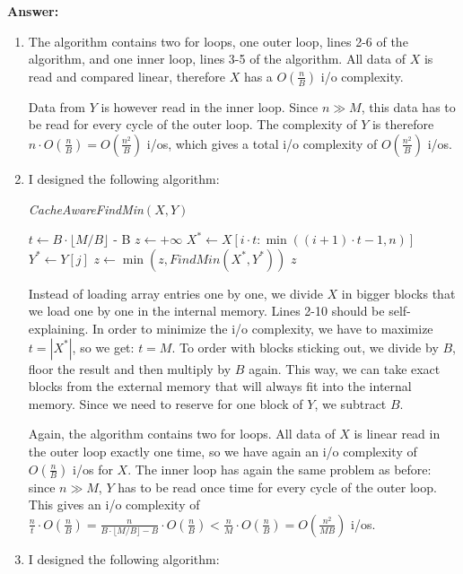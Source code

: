 \documentclass{article}
\newcommand{\io}{{\sc i/o}\xspace}
\newcommand{\ios}{{\io}s\xspace}
\newcounter{rcounter}
\newenvironment{rlist}%
{\begin{list}{\setnr-\arabic{rcounter}}{\usecounter{rcounter}}}{\end{list}}
\begin{document}
\begin{rlist}
        \textbf{Answer:}
        \begin{enumerate}
            \item[(i)]
            The algorithm contains two for loops, one outer loop, lines 2-6 of the algorithm, and one inner loop, lines 3-5 of the algorithm. All data of $X$ is read and compared linear, therefore $X$ has a $O(\frac{n}{B})$ \io complexity.
            
            Data from $Y$ is however read in the inner loop. Since $n \gg M$, this data has to be read for every cycle of the outer loop. The complexity of $Y$ is therefore $n \cdot O(\frac{n}{B}) = O(\frac{n^2}{B})$ \ios, which gives a total \io complexity of $O(\frac{n^2}{B})$ \ios.
            \item[(ii)]
            I designed the following algorithm:
            
            \emph{CacheAwareFindMin}$(X,Y)$
            \begin{algorithmic}[1]
                \State $t \gets B \cdot \lfloor M / B \rfloor$ - B
                \State $z \gets +\infty$
                \State $X^* \gets X[i \cdot t : \min ((i+1) \cdot t - 1, n)]$
                \State $Y^* \gets Y[j]$
                \State $z \gets \min (z, FindMin(X^*, Y^*))$
                \EndFor
                \EndFor
                \State \Return $z$
            \end{algorithmic}
            
            Instead of loading array entries one by one, we divide $X$ in bigger blocks that we load one by one in the internal memory. Lines 2-10 should be self-explaining. In order to minimize the \io complexity, we have to maximize $t = |X^*|$, so we get: $t = M$. To order with blocks sticking out, we divide by $B$, floor the result and then multiply by $B$ again. This way, we can take exact blocks from the external memory that will always fit into the internal memory. Since we need to reserve for one block of $Y$, we subtract $B$. 
            
            Again, the algorithm contains two for loops. All data of $X$ is linear read in the outer loop exactly one time, so we have again an \io complexity of $O(\frac{n}{B})$ \ios for $X$. The inner loop has again the same problem as before: since $n \gg M$, $Y$ has to be read once time for every cycle of the outer loop. This gives an \io complexity of $\frac{n}{t} \cdot O(\frac{n}{B}) = \frac{n}{B \cdot \lfloor M / B \rfloor - B} \cdot O(\frac{n}{B}) < \frac{n}{M} \cdot O(\frac{n}{B}) = O(\frac{n^2}{MB})$ \ios.
            \item[(iii)]
            I designed the following algorithm:
            

\end{enumerate}
\end{rlist}
\end{document}

